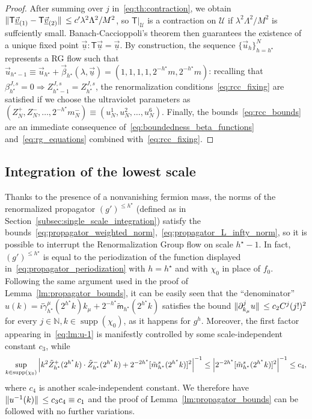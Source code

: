 \documentclass[a4paper, 11pt]{article}
\newcommand{\N}{\mathbb{N}}
\newcommand{\cutoff}{\Lambda}								%
\newcommand{\sing}[2]{{#1}^{#2}}							%
\DeclareMathOperator{\supp}{supp}							%
\theoremstyle{thm}
\begin{document}
\begin{proof}
After summing over $j$ in~\eqref{eq:th:contraction}, we obtain $\norm*{\mathsf{T} \underline{\vec{v}}_{(1)} - \mathsf{T} \underline{\vec{v}}_{(2)}} \le c' \lambda^2 \cutoff^2/M^2$, so $\mathsf{T} \vert_{\mathcal{U}}$ is a contraction on $\mathcal{U}$ if $\lambda^2 \cutoff^2/M^2$ is suffciently small. Banach-Caccioppoli's theorem then guarantees the existence of a unique fixed point $\underline{\vec{u}} \colon \mathsf{T} \underline{\vec{u}} = \underline{\vec{u}}$. By construction, the sequence $\lbrace \vec{u}_h \rbrace_{h = h^\star}^N$ represents a RG flow such that $\vec{u}_{h^\star-1} \equiv \vec{u}_{h^\star} + \vec{\beta}_{h^\star}(\lambda, \underline{\vec{u}}) = (1, 1, 1, 1, 2^{-h^\star} m, 2^{-h^\star} m)$: recalling that $\beta^{J, s}_{h^\star} = 0 \Rightarrow Z^{J, s}_{h^\star-1} = Z^{J, s}_{h^\star}$, the renormalization conditions~\eqref{eq:rcc_fixing} are satisfied if we choose the ultraviolet parameters as $(Z^+_N, Z^-_N, \dots, 2^{-h^\star} m^-_N) \equiv (u_N^1, u_N^2, \dots, u_N^6)$. Finally, the bounds~\eqref{eq:rcc_bounds} are an immediate consequence of~\eqref{eq:boundedness_beta_functions} and~\eqref{eq:rg_equations} combined with~\eqref{eq:rcc_fixing}.
\end{proof}

\subsection{Integration of the lowest scale}
\label{subsec:last_scale}
Thanks to the presence of a nonvanishing fermion mass, the norms of the renormalized propagator $\sing{(g')}{\le h^\star}$ (defined as in Section~\ref{subsec:single_scale_integration}) satisfy the bounds~\eqref{eq:propagator_weighted_norm},~\eqref{eq:propagator_L_infty_norm}, so it is possible to interrupt the Renormalization Group flow on scale $h^\star - 1$. In fact, $\sing{(g')}{\le h^\star}$ is equal to the periodization of the function displayed in~\eqref{eq:propagator_periodization} with $h = h^\star$ and with $\chi_0$ in place of $f_0$. Following the same argument used in the proof of Lemma~\ref{lm:propagator_bounds}, it can be easily seen that the ``denominator'' $u(k) = i \tilde{\gamma}^\mu_{h^\star}(2^{h^\star}k) k_\mu + 2^{-h^\star}\tilde{\mathsf{m}}_{h^\star}(2^{h^\star}k)$ satisfies the bound $\norm*{\partial_{k_\mu}^j u} \le c_2 C^j (j!)^2$ for every $j \in \N, k \in \supp(\chi_0)$, as it happens for $\sing{g}{h}$. Moreover, the first factor appearing in~\eqref{eq:lm:u-1} is manifestly controlled by some scale-independent constant $c_3$, while
\begin{equation}
\label{eq:mass_dominance_over_kinetic_term}
\sup_{k \in \supp(\chi_0)}\abs{k^2 \tilde{Z}^+_{h^\star}(2^{h^\star} k) \cdot \tilde{Z}^-_{h^\star}(2^{h^\star}k) + 2^{-2h^\star}[\tilde{m}^s_{h^\star}(2^{h^\star}k)]^2}^{-1} \le \abs{2^{-2h^\star}[\tilde{m}^s_{h^\star}(2^{h^\star}k)]^2}^{-1} \le c_4,
\end{equation}
where $c_4$ is another scale-independent constant. We therefore have $\norm*{u^{-1}(k)} \le c_3 c_4 \equiv c_1$ and the proof of Lemma~\ref{lm:propagator_bounds} can be followed with no further variations.
\end{document}
